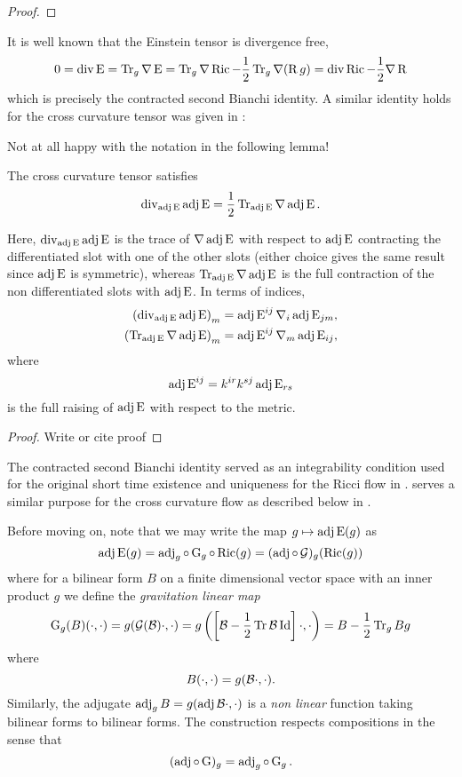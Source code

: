 \documentclass[a4paper, 12pt]{amsart}
\begin{document}
\begin{proof}

\end{proof}

It is well known that the Einstein tensor is divergence free,
\[
0 = \operatorname{div} \operatorname{E} = \operatorname{Tr}_g \nabla \operatorname{E} = \operatorname{Tr}_g \nabla \operatorname{Ric} - \frac{1}{2} \operatorname{Tr}_g \nabla (\operatorname{R} g) = \operatorname{div} \operatorname{Ric} - \frac{1}{2} \nabla \operatorname{R}
\]
which is precisely the contracted second Bianchi identity. A similar identity holds for the cross curvature tensor was given in \cite[Lemma 1]{MR2055396}:

{\color{red} Not at all happy with the notation in the following lemma!}

\begin{lemma}
\label{lem:xcf_hamilton_integrability}
The cross curvature tensor satisfies
\[
\operatorname{div}_{\operatorname{adj}\operatorname{E}} \operatorname{adj}\operatorname{E} = \frac{1}{2} \operatorname{Tr}_{\operatorname{adj}\operatorname{E}} \nabla \operatorname{adj}\operatorname{E}.
\]
\end{lemma}

Here, \(\operatorname{div}_{\operatorname{adj}\operatorname{E}} \operatorname{adj}\operatorname{E}\) is the trace of \(\nabla \operatorname{adj}\operatorname{E}\) with respect to \(\operatorname{adj}\operatorname{E}\) contracting the differentiated slot with one of the other slots (either choice gives the same result since \(\operatorname{adj}\operatorname{E}\) is symmetric), whereas \(\operatorname{Tr}_{\operatorname{adj}\operatorname{E}} \nabla\operatorname{adj}\operatorname{E}\) is the full contraction of the non differentiated slots with \(\operatorname{adj}\operatorname{E}\). In terms of indices,
\[
\begin{split}
\left(\operatorname{div}_{\operatorname{adj}\operatorname{E}} \operatorname{adj}\operatorname{E}\right)_m &= \operatorname{adj}\operatorname{E}^{ij} \nabla_i \operatorname{adj}\operatorname{E}_{jm}, \\
\left(\operatorname{Tr}_{\operatorname{adj}\operatorname{E}} \nabla \operatorname{adj}\operatorname{E}\right)_m &= \operatorname{adj}\operatorname{E}^{ij} \nabla_m \operatorname{adj}\operatorname{E}_{ij},
\end{split}
\]
where
\[
\operatorname{adj}\operatorname{E}^{ij} = k^{ir}k^{sj} \operatorname{adj}\operatorname{E}_{rs}
\]
is the full raising of \(\operatorname{adj}\operatorname{E}\) with respect to the metric.

\begin{proof}
{\color{red}Write or cite proof}
\end{proof}

The contracted second Bianchi identity served as an integrability condition used for the original short time existence and uniqueness for the Ricci flow in \cite{Hamilton:/1982}.  serves a similar purpose for the cross curvature flow as described below in .

Before moving on, note that we may write the map \(g \mapsto \operatorname{adj}\operatorname{E}(g)\) as
\[
\operatorname{adj}\operatorname{E}(g) = \operatorname{adj}_g \circ \operatorname{G}_g \circ \operatorname{Ric} (g) = (\operatorname{adj} \circ \operatorname{\mathcal{G}})_g (\operatorname{Ric}(g))
\]
where for a bilinear form \(B\) on a finite dimensional vector space with an inner product \(g\) we define the \emph{gravitation linear map}
\[
\operatorname{G}_g(B) (\cdot, \cdot) = g(\operatorname{\mathcal{G}}(\mathcal{B}) \cdot, \cdot) = g\left(\left[\mathcal{B} - \frac{1}{2} \operatorname{Tr}\mathcal{B} \operatorname{Id}\right] \cdot, \cdot\right) = B - \frac{1}{2} \operatorname{Tr}_g B g
\]
where
\[
B(\cdot, \cdot) = g(\mathcal{B} \cdot, \cdot).
\]
Similarly, the adjugate \(\operatorname{adj}_g B = g(\operatorname{adj}\mathcal{B} \cdot, \cdot)\) is a \emph{non linear} function taking bilinear forms to bilinear forms. The construction respects compositions in the sense that
\[
(\operatorname{adj} \circ \operatorname{G})_g = \operatorname{adj}_g \circ \operatorname{G}_g.
\]
\end{document}
